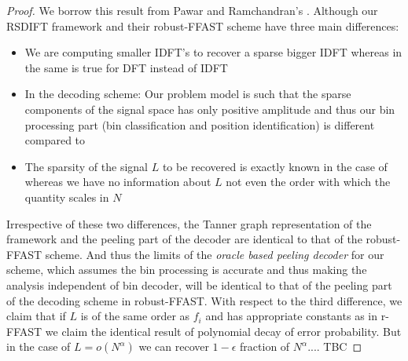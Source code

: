 \begin{proof}
We borrow this result from Pawar and Ramchandran's \cite{pawar2014robust}. Although our RSDIFT framework and their robust-FFAST scheme have three main differences: 
\begin{itemize}
\item We are computing smaller IDFT's to recover a sparse bigger IDFT whereas in \cite{pawar2014robust} the same is true for DFT instead of IDFT
\item In the decoding scheme: Our problem model is such that the sparse components of the signal space has only positive amplitude and thus our bin processing part (bin classification and position identification) is different compared to \cite{pawar2014robust}
\item The sparsity of the signal $L$ to be recovered is exactly known in the case of \cite{pawar2014robust} whereas we have no information  about $L$ not even the order with which the quantity scales in $N$
\end{itemize}
Irrespective of these two differences, the Tanner graph representation of the framework and the peeling part of the decoder are identical to that of the robust-FFAST scheme. And thus the limits of the {\it oracle based peeling decoder} for our scheme, which assumes the bin processing is accurate and thus making the analysis independent of bin decoder, will be identical to that of the peeling part of the decoding scheme in robust-FFAST. With respect to the third difference, we claim that if $L$ is of the same order as $f_i$ and has appropriate constants as in r-FFAST we claim the identical result of polynomial decay of error probability. But in the case of $L=o(N^{\alpha})$ we can recover $1-\epsilon$ fraction of $N^{\alpha}$.... TBC
\end{proof}


